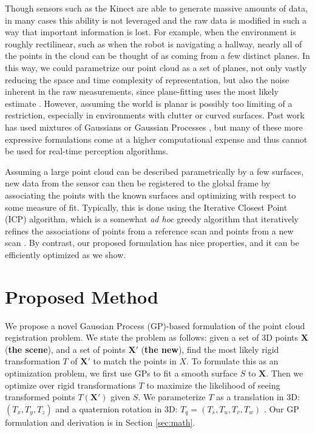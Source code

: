 \documentclass{article} %
\begin{document}
Though sensors such as the Kinect are able to generate massive amounts of data, in many cases this ability is not leveraged and the raw data is modified in such a way that important information is lost. For example, when the environment is roughly rectilinear, such as when the robot is navigating a hallway, nearly all of the points in the cloud can be thought of as coming from a few distinct planes. In this way, we could parametrize our point cloud as a set of planes, not only vastly reducing the space and time complexity of representation, but also the noise inherent in the raw measurements, since plane-fitting uses the most likely estimate \cite{martin_real-time_2002}\cite{liu_using_2001}\cite{thrun_real-time_2004}. However, assuming the world is planar is possibly too limiting of a restriction, especially in environments with clutter or curved surfaces. Past work has used mixtures of Gaussians \cite{tsin2004correlation} \cite{jian2005robust} or Gaussian Processes \cite{plagemann2008nonstationary}, but many of these more expressive formulations come at a higher computational expense and thus cannot be used for real-time perception algorithms.

Assuming a large point cloud can be described parametrically by a few surfaces, new data from the sensor can then be registered to the global frame by associating the points with the known surfaces and optimizing with respect to some measure of fit. Typically, this is done using the Iterative Closest Point (ICP) algorithm, which is a somewhat \emph{ad hoc} greedy algorithm that iteratively refines the associations of points from a reference scan and points from a new scan \cite{besl_method_1992}. By contrast, our proposed formulation has nice properties, and it can be efficiently optimized as we show.


\section{Proposed Method}

We propose a novel Gaussian Process (GP)-based formulation of the point cloud registration problem.
We state the problem as follows: given a set of 3D points $\mathbf{X}$ ({\bf the scene}), and a set of points $\mathbf{X'}$ ({\bf the new}), find the most likely rigid transformation $T$ of $\mathbf{X'}$ to match the points in $X$. 
To formulate this as an optimization problem, we first use GPs to fit a smooth surface $S$ to $\mathbf{X}$. Then we optimize over
rigid transformations $T$ to maximize the likelihood of seeing transformed points $T(\mathbf{X'})$ given $S$. We parameterize $T$ as a translation in 3D: $(T_x, T_y, T_z)$ and a quaternion rotation in 3D: $T_q = (T_s, T_u, T_v, T_w)$ . Our GP formulation and derivation is in Section \ref{sec:math}.
\end{document}
